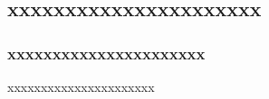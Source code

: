 \documentclass{beamer}
\begin{document}
\subsection{xxxxxxxxxxxxxxxxxxxxxx}
\subsubsection{xxxxxxxxxxxxxxxxxxxxxx}
\begin{frame}{xxxxxxxxxxxxxxxxxxxxxx}

\end{frame}

\end{document}
